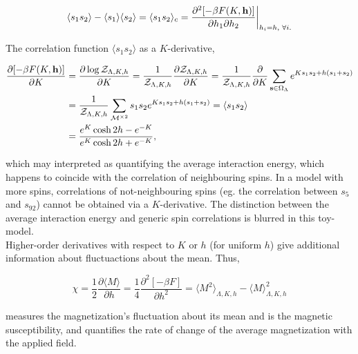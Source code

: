 \documentclass{homework}
\begin{document}
\begin{equation}
    \begin{split}
        \langle s_1 s_2 \rangle - \langle s_1 \rangle \langle s_2 \rangle = \langle s_1 s_2 \rangle_c = \frac{\partial^2 [-\beta F(K,{\bf h})]}{\partial h_1 \partial h_2}\bigg|_{h_i = h, \textnormal{ } \forall i.}
    \end{split}
\end{equation}

The correlation function $\langle s_1 s_2 \rangle$ as a $K$-derivative, 

\begin{equation}
    \begin{split}
        \frac{\partial[-\beta F(K,{\bf h})]}{\partial K} &= \frac{\partial \log \mathcal{Z}_{\Lambda, K, h}}{\partial K} = \frac{1}{\mathcal{Z}_{\Lambda, K, h}}\frac{\partial \mathcal{Z}_{\Lambda, K, h}}{\partial K} = \frac{1}{\mathcal{Z}_{\Lambda, K, h}} \frac{\partial}{\partial K}  \sum_{{\bf s} \in \Omega_{\Lambda}} e^{K s_1 s_2 + h(s_1+s_2)} \\
        &= \frac{1}{\mathcal{Z}_{\Lambda, K, h}} \sum_{\mathcal{M}^{\times 2}} s_1 s_2 e^{K s_1 s_2 + h(s_1+s_2)} = \langle s_1 s_2 \rangle \\
        &= \frac{e^K \cosh 2h - e^{-K}}{e^K \cosh 2h + e^{-K}},
    \end{split}
\end{equation}

which may interpreted as quantifying the average interaction energy, which happens to coincide with the correlation of neighbouring spins. In a model with more spins, correlations of not-neighbouring spins (eg. the correlation between $s_5$ and $s_{92}$) cannot be obtained via a $K$-derivative. The distinction between the average interaction energy and generic spin correlations is blurred in this toy-model. \\

Higher-order derivatives with respect to $K$ or $h$ (for uniform $h$) give additional information about fluctuactions about the mean. Thus, 

\begin{equation}
    \chi = \frac{1}{2} \frac{ \partial \langle M \rangle}{\partial h} = \frac{1}{4} \frac{\partial^2 [-\beta F]}{\partial h^2} = \langle M^2 \rangle_{\Lambda, K, h}- \langle M \rangle^2_{\Lambda, K, h}
\end{equation}

measures the magnetization's fluctuation about its mean and is the magnetic susceptibility, and quantifies the rate of change of the average magnetization with the applied field. \\
\end{document}
